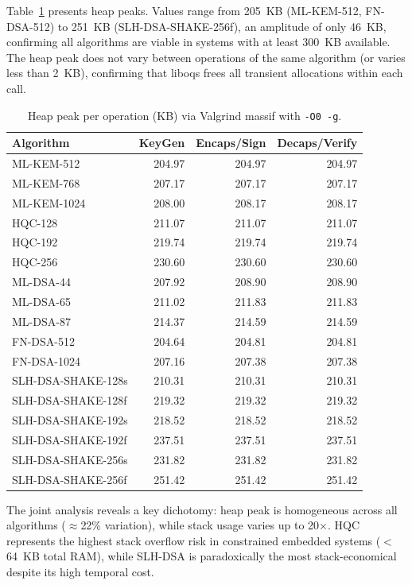 \documentclass[12pt]{article}
\begin{document}
Table~\ref{tab:heap} presents heap peaks. Values range from 205~KB
(ML-KEM-512, FN-DSA-512) to 251~KB (SLH-DSA-SHAKE-256f), an amplitude of
only 46~KB, confirming all algorithms are viable in systems with at least
300~KB available. The heap peak does not vary between operations of the same
algorithm (or varies less than 2~KB), confirming that liboqs frees all
transient allocations within each call.

\begin{table}[htbp]
\centering
\caption{Heap peak per operation (KB) via Valgrind massif with \texttt{-O0 -g}.}
\label{tab:heap}
\small
\begin{tabular}{lrrr}
\hline
\textbf{Algorithm} & \textbf{KeyGen} & \textbf{Encaps/Sign} & \textbf{Decaps/Verify} \\
\hline
ML-KEM-512    & 204.97 & 204.97 & 204.97 \\
ML-KEM-768    & 207.17 & 207.17 & 207.17 \\
ML-KEM-1024   & 208.00 & 208.17 & 208.17 \\
HQC-128       & 211.07 & 211.07 & 211.07 \\
HQC-192       & 219.74 & 219.74 & 219.74 \\
HQC-256       & 230.60 & 230.60 & 230.60 \\
\hline
ML-DSA-44     & 207.92 & 208.90 & 208.90 \\
ML-DSA-65     & 211.02 & 211.83 & 211.83 \\
ML-DSA-87     & 214.37 & 214.59 & 214.59 \\
FN-DSA-512    & 204.64 & 204.81 & 204.81 \\
FN-DSA-1024   & 207.16 & 207.38 & 207.38 \\
SLH-DSA-SHAKE-128s & 210.31 & 210.31 & 210.31 \\
SLH-DSA-SHAKE-128f & 219.32 & 219.32 & 219.32 \\
SLH-DSA-SHAKE-192s & 218.52 & 218.52 & 218.52 \\
SLH-DSA-SHAKE-192f & 237.51 & 237.51 & 237.51 \\
SLH-DSA-SHAKE-256s & 231.82 & 231.82 & 231.82 \\
SLH-DSA-SHAKE-256f & 251.42 & 251.42 & 251.42 \\
\hline
\end{tabular}
\end{table}

The joint analysis reveals a key dichotomy: heap peak is homogeneous across
all algorithms ($\approx$22\% variation), while stack usage varies up to
20$\times$. HQC represents the highest stack overflow risk in constrained
embedded systems ($<$64~KB total RAM), while SLH-DSA is paradoxically the
most stack-economical despite its high temporal cost.
\end{document}
